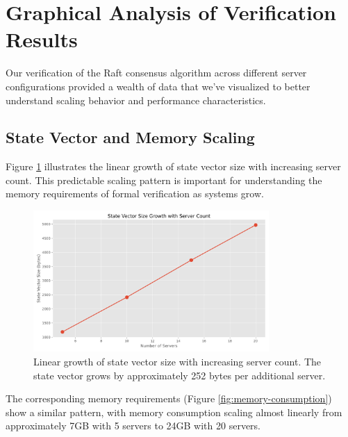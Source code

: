 
\section{Graphical Analysis of Verification Results}

Our verification of the Raft consensus algorithm across different server configurations provided a wealth of data that we've visualized to better understand scaling behavior and performance characteristics.

\subsection{State Vector and Memory Scaling}

Figure \ref{fig:state-vector} illustrates the linear growth of state vector size with increasing server count. This predictable scaling pattern is important for understanding the memory requirements of formal verification as systems grow.

\begin{figure}[htbp]
    \centering
    \includegraphics[width=0.8\textwidth]{graphs/state_vector_size.png}
    \caption{Linear growth of state vector size with increasing server count. The state vector grows by approximately 252 bytes per additional server.}
    \label{fig:state-vector}
\end{figure}

The corresponding memory requirements (Figure \ref{fig:memory-consumption}) show a similar pattern, with memory consumption scaling almost linearly from approximately 7GB with 5 servers to 24GB with 20 servers.

